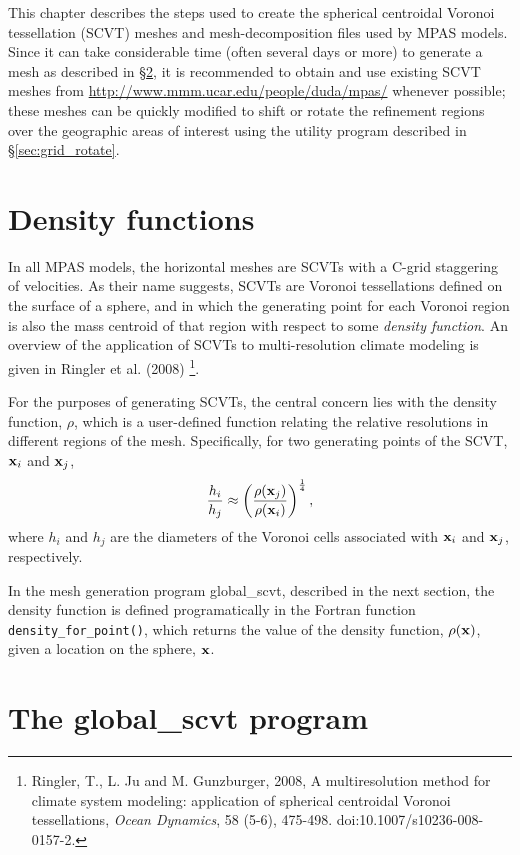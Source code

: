 \label{chap:mpas_grid_generation}

This chapter describes the steps used to create the  spherical centroidal Voronoi tessellation (SCVT) meshes and mesh-decomposition files used by MPAS models.
Since it can take considerable time (often several days or more) to generate a mesh as described in \S \ref{sec:global_scvt}, it is recommended to obtain 
and use existing SCVT meshes from \url{http://www.mmm.ucar.edu/people/duda/mpas/} whenever possible; these meshes can be quickly
modified to shift or rotate the refinement regions over the geographic areas of interest using the utility program described in \S \ref{sec:grid_rotate}.

\section{Density functions}

In all MPAS models, the horizontal meshes are SCVTs with a C-grid staggering of
velocities. As their name suggests, SCVTs are Voronoi tessellations defined on the surface of a sphere, and in which the generating 
point for each Voronoi region is also the mass centroid of that region with respect to some {\em density function}. An overview of
the application of SCVTs to multi-resolution climate modeling is given in Ringler et al. (2008)
\footnote{Ringler, T., L. Ju and M. Gunzburger, 2008, A multiresolution method for climate system modeling: application of spherical centroidal Voronoi tessellations, {\em Ocean Dynamics}, 58 (5-6), 475-498. doi:10.1007/s10236-008-0157-2.}.

For the purposes of generating SCVTs, the central concern lies with the density function, $\rho$, which is a user-defined
function relating the relative resolutions in different regions of the mesh. Specifically, for two generating points of the 
SCVT, ${\bf x}_i$ and ${\bf x}_j$,
\[
{h_i \over h_j} \approx \left({\rho({\bf x}_j) \over \rho({\bf x}_i)} \right)^{1 \over 4},
\]
where $h_i$ and $h_j$ are the diameters of the Voronoi cells associated with ${\bf x}_i$ and ${\bf x}_j$, respectively.

In the mesh generation program global\_scvt, described in the next section, the density function is defined programatically in the Fortran function
{\tt density\_for\_point()}, which returns the value of the density function, $\rho({\bf x})$, given a location on the sphere, ${\bf x}$.
   
\section{The global\_scvt program}
\label{sec:global_scvt}

